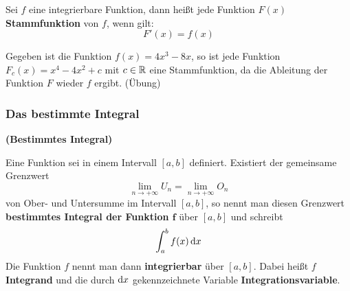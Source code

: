 \documentclass[ngerman, 12pt]{nssheetxea}
\begin{document}
\begin{definition}
Sei $f$ eine integrierbare Funktion, dann heißt jede Funktion $F(x)$ \textbf{Stammfunktion} von $f$, wenn gilt:
\[ F'(x)=f(x) \]
 
\end{definition}

\begin{example}
Gegeben ist die Funktion $f(x)=4x^3-8x$, so ist jede Funktion $F_c(x)=x^4-4x^2+c$ mit $c\in \mathbb{R}$ eine Stammfunktion, da die Ableitung der Funktion $F$ wieder $f$ ergibt. (Übung)
\begin{center}
\end{center}


\end{example}
\subsubsection{Das bestimmte Integral}

\begin{definition} \textbf{(Bestimmtes Integral)} \par
Eine Funktion sei in einem Intervall $[a,b]$ definiert. Existiert der gemeinsame Grenzwert 
\[ \lim_{n\rightarrow +\infty} U_n = \lim_{n\rightarrow +\infty} O_n\] 
von Ober- und Untersumme im Intervall $[a,b]$, so nennt man diesen Grenzwert \textbf{bestimmtes Integral der Funktion $\mathbf{f}$} über $[a,b]$ und schreibt 
\[ \int_a^b f(x) \mathop{}\!\mathrm{d} x  \]
Die Funktion $f$ nennt man dann \textbf{integrierbar} über $[a,b]$. Dabei heißt $f$ \textbf{Integrand} und die durch $\mathop{}\!\mathrm{d} x$ gekennzeichnete Variable \textbf{Integrationsvariable}.
\end{definition}
\end{document}
